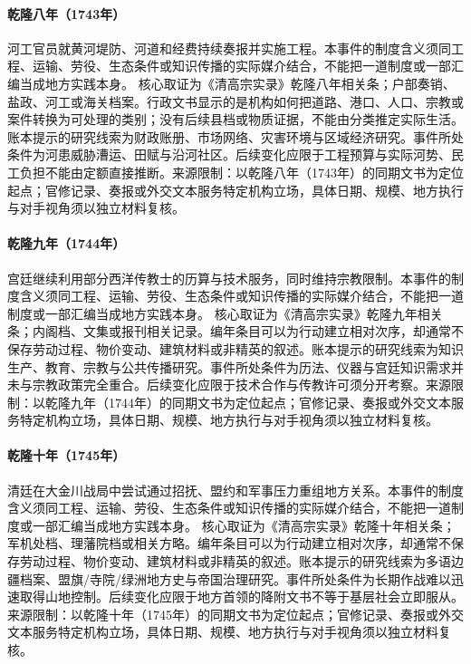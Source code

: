 \hypertarget{civic:EQ-1743-YELLOW-RIVER-WORKS}{}\paragraph{乾隆八年（1743年）}河工官员就黄河堤防、河道和经费持续奏报并实施工程。本事件的制度含义须同工程、运输、劳役、生态条件或知识传播的实际媒介结合，不能把一道制度或一部汇编当成地方实践本身。 核心取证为《清高宗实录》乾隆八年相关条；户部奏销、盐政、河工或海关档案。行政文书显示的是机构如何把道路、港口、人口、宗教或案件转换为可处理的类别；没有后续县档或物质证据，不能由分类推定实际生活。账本提示的研究线索为财政账册、市场网络、灾害环境与区域经济研究。事件所处条件为河患威胁漕运、田赋与沿河社区。后续变化应限于工程预算与实际河势、民工负担不能由定额直接推断。来源限制：以乾隆八年（1743年）的同期文书为定位起点；官修记录、奏报或外交文本服务特定机构立场，具体日期、规模、地方执行与对手视角须以独立材料复核。
\hypertarget{civic:EQ-1744-JESUIT-CALENDAR-SERVICE}{}\paragraph{乾隆九年（1744年）}宫廷继续利用部分西洋传教士的历算与技术服务，同时维持宗教限制。本事件的制度含义须同工程、运输、劳役、生态条件或知识传播的实际媒介结合，不能把一道制度或一部汇编当成地方实践本身。 核心取证为《清高宗实录》乾隆九年相关条；内阁档、文集或报刊相关记录。编年条目可以为行动建立相对次序，却通常不保存劳动过程、物价变动、建筑材料或非精英的叙述。账本提示的研究线索为知识生产、教育、宗教与公共传播研究。事件所处条件为历法、仪器与宫廷知识需求并未与宗教政策完全重合。后续变化应限于技术合作与传教许可须分开考察。来源限制：以乾隆九年（1744年）的同期文书为定位起点；官修记录、奏报或外交文本服务特定机构立场，具体日期、规模、地方执行与对手视角须以独立材料复核。
\hypertarget{civic:EQ-1745-JINCHUAN-NEGOTIATION}{}\paragraph{乾隆十年（1745年）}清廷在大金川战局中尝试通过招抚、盟约和军事压力重组地方关系。本事件的制度含义须同工程、运输、劳役、生态条件或知识传播的实际媒介结合，不能把一道制度或一部汇编当成地方实践本身。 核心取证为《清高宗实录》乾隆十年相关条；军机处档、理藩院档或相关方略。编年条目可以为行动建立相对次序，却通常不保存劳动过程、物价变动、建筑材料或非精英的叙述。账本提示的研究线索为多语边疆档案、盟旗/寺院/绿洲地方史与帝国治理研究。事件所处条件为长期作战难以迅速取得山地控制。后续变化应限于地方首领的降附文书不等于基层社会立即服从。来源限制：以乾隆十年（1745年）的同期文书为定位起点；官修记录、奏报或外交文本服务特定机构立场，具体日期、规模、地方执行与对手视角须以独立材料复核。
